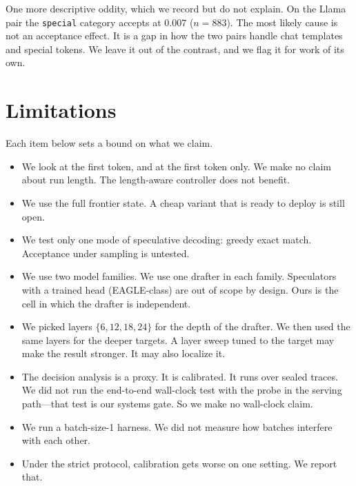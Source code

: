 \documentclass[11pt]{article}
\begin{document}
One more descriptive oddity, which we record but do not explain. On the Llama pair the
\texttt{special} category accepts at $0.007$ ($n{=}883$). The most likely
cause is not an acceptance effect. It is a gap in how the two pairs handle
chat templates and special tokens. We leave it out of the contrast, and we
flag it for work of its own.

\section{Limitations}
\label{sec:limitations}

Each item below sets a bound on what we claim.

\begin{itemize}

\item We look at the first token, and at the first token only. We make no
claim about run length. The length-aware controller does not benefit.

\item We use the full frontier state. A cheap variant that is ready to deploy
is still open.

\item We test only one mode of speculative decoding: greedy exact match.
Acceptance under sampling is untested.

\item We use two model families. We use one drafter in each family.
Speculators with a trained head (EAGLE-class) are out of scope by design. Ours
is the cell in which the drafter is independent.

\item We picked layers $\{6,12,18,24\}$ for the depth of the drafter. We then
used the same layers for the deeper targets. A layer sweep tuned to the target
may make the result stronger. It may also localize it.

\item The decision analysis is a proxy. It is calibrated. It runs over sealed
traces. We did not run the end-to-end wall-clock test with the probe in the
serving path---that test is our systems gate. So we make no wall-clock claim.

\item We run a batch-size-1 harness. We did not measure how batches interfere
with each other.

\item Under the strict protocol, calibration gets worse on one setting. We
report that.


\end{itemize}
\end{document}

